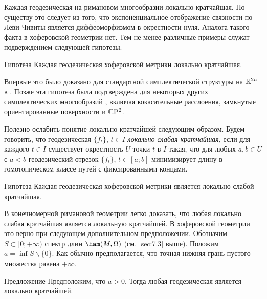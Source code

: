 Каждая геодезическая на римановом многообразии локально кратчайшая.
По существу это следует из того, что экспоненциальное отображение связности по Леви-Чивиты является диффеоморфизмом в окрестности нуля.
Аналога такого факта в хоферовской геометрии нет.
Тем не менее различные примеры служат подверждением следующей гипотезы.

\begin{thm}{Гипотеза}\label{12.6.A}
Каждая геодезическая хоферовской метрики локально кратчайшая.
\end{thm}

Впервые это было доказано для стандартной симплектической структуры на $\mathbb{R}^{2n}$ в \cite{BP1}.
Позже эта гипотеза была подтверждена для некоторых других симплектических многообразий \cite{LM2}, включая кокасательные расслоения, замкнутые ориентированные поверхности и $\mathbb{C}\mathrm{P}^2$.

Полезно ослабить понятие локально кратчайшей следующим образом.
Будем говорить, что геодезическая $\{f_t\}$, $t\in I$ \emph{локально слабая кратчайшая}, если для каждого $t\in I$ существует окрестность $U$ точки $t$ в $I$ такая, что для любых $a, b\in U$ с $a < b$ геодезический отрезок $\{f_t\}$, $t\in [a;b]$ минимизирует длину в гомотопическом классе путей с фиксированными концами.

\begin{thm}{Гипотеза}\label{12.6.B}
Каждая геодезическая хоферовской метрики является локально слабой кратчайшая.
\end{thm}

В конечномерной римановой геометрии легко доказать, что любая локально слабая кратчайшая является локальную кратчайшей.
В хоферовской геометрии это верно при следующем дополнительном предположении.
Обозначим $S \subset [0; +\infty)$ спектр длин $\Ham(M, \Omega)$ (см. \ref{sec:7.3} выше).
Положим $a = \inf S\backslash\{0\}$.
Как обычно предполагается, что точная нижняя грань пустого множества равена $+\infty$.

\begin{thm}[(\cite{LM2})]{Предложение}\label{12.6.C}
Предположим, что $a>0$.
Тогда любая геодезическая является локально кратчайшей.
\end{thm}

